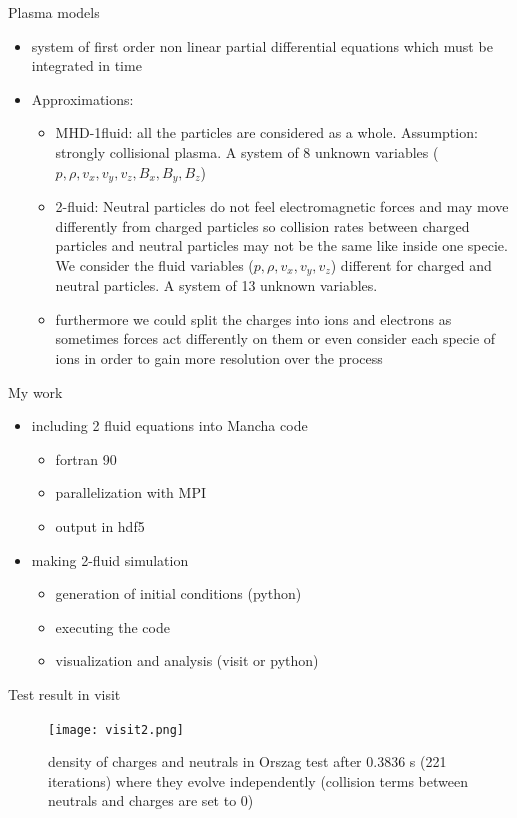 \documentclass{beamer}
\begin{document}
\begin{frame}{Plasma models}
\begin{itemize}
\item system of first order non linear partial differential equations which must be integrated in time
\item Approximations:
\begin{itemize}
\item MHD-1fluid: all the particles are considered as a whole. Assumption: strongly collisional plasma. A system of 8 unknown variables
($p,\rho,v_x,v_y,v_z,B_x,B_y,B_z$)
\item 2-fluid: Neutral particles do not feel electromagnetic forces and may move  differently from charged particles so collision rates between 
charged particles and neutral particles may not be the same like inside one specie. 
We consider the fluid variables ($p,\rho,v_x,v_y,v_z$) different for charged and neutral particles. A system of 13 unknown variables.
\item furthermore we could split the charges into ions and electrons as sometimes forces act differently on them or even consider each specie of ions
in order to gain more resolution over the process
\end{itemize}
\end{itemize}
\end{frame}

\begin{frame}{My work}
\begin{itemize}
\item including 2 fluid equations into  Mancha code
\begin{itemize}
\item fortran 90
\item parallelization with MPI
\item output in hdf5
\end{itemize}
\item making 2-fluid simulation
\begin{itemize}
\item generation of initial conditions (python)
\item executing the code
\item visualization  and analysis (visit or python)
\end{itemize}
\end{itemize}
\end{frame}

\begin{frame}{Test result in visit}
\begin{figure}[H]
 \centering
 \texttt{[image: visit2.png]}
  \caption{density of charges and neutrals in Orszag test after 0.3836 s (221 iterations) where they evolve independently (collision terms between neutrals and charges are set to 0)}
\end{figure}
\end{frame}
\end{document}
